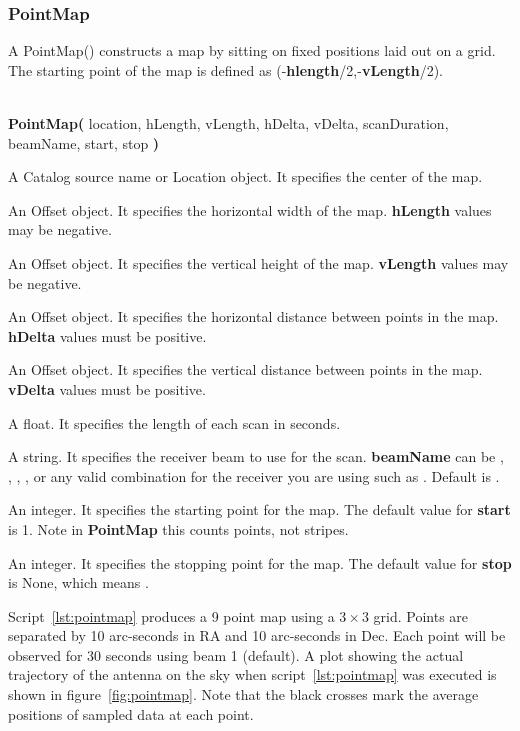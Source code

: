 \subsubsection{PointMap}

A PointMap() constructs a map by sitting on fixed positions laid out on a grid.
The starting point of the map is defined as (-{\bf hlength}/2,-{\bf vLength}/2).

\begin{description}[itemsep=0pt]
\item[{\bf SYNTAX}:]\ \\
{\bfseries{\textcolor{pythonKeywords}{PointMap}}(}
location, hLength, vLength, hDelta, vDelta, scanDuration, beamName, start, stop
{\bf)}
\item[location] A Catalog source name or Location object. It specifies the 
center of the map.
\item[hLength] An Offset object. It specifies the horizontal width of the map. {\bf hLength} values
may be negative.
\item[vLength] An Offset object. It specifies the vertical height of the map. {\bf vLength} values
may be negative.
\item[hDelta] An Offset object. It specifies the horizontal distance between 
points in the map.  {\bf hDelta} values must be positive.
\item[vDelta] An Offset object. It specifies the vertical distance between 
points in the map. {\bf vDelta} values must be positive.
\item[scanDuration] A float. It specifies the length of each scan in seconds.
\item[beamName] A string. It specifies the receiver beam to use for the scan. 
{\bf beamName} can be , , , ,  or any valid combination
for the  receiver you are using such as . Default is .
\item[start] An integer. It specifies the starting point for the map. The 
default value for {\bf start} is 1.  Note in
{\bfseries{\textcolor{pythonKeywords}{PointMap}}} this counts points, not stripes.
\item[stop] An integer. It specifies the stopping point for the map. The 
default value for {\bf stop} is None, which means .

\newpage

\item[{\bf USAGE}:]
Script~\ref{lst:pointmap} produces a 9 point map using a $3\times 3$ grid.  Points are
separated by 10 arc-seconds in RA and 10 arc-seconds in Dec.  Each point will
be observed for 30 seconds using beam 1 (default).  A plot showing the actual
trajectory of the antenna on the sky when script~\ref{lst:pointmap} was executed
is shown in figure~\ref{fig:pointmap}.  Note that the black crosses mark the
average positions of sampled data at each point.

\end{description}

